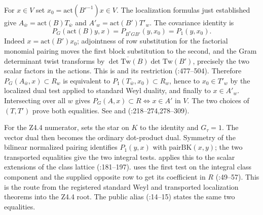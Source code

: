 For $x\in V$ set $x_0=\mathrm{act}(B'^{-1})x\in V$.
The localization formulas just established give
$A_{\bar w}=\mathrm{act}(B)T_{\bar w}$ and
$A'_w=\mathrm{act}(B')T'_w$. The covariance identity is
\[
 P_G(\mathrm{act}(B)y,x)
   =P_{B^*GB'}(y,x_0)=P_1(y,x_0).
\]
Indeed $x=\mathrm{act}(B')x_0$; adjointness of row substitution for
the factorial monomial pairing moves the first block substitution
to the second, and the Gram determinant twist transforms by
$\overline{\det\mathrm{Tw}(B)}\det\mathrm{Tw}(B')$, precisely
the two scalar factors in the actions. This is 
and its restriction 
(:477--504).
Therefore $P_G(A_{\bar w},x)\subset R_w$ is equivalent to
$P_1(T_{\bar w},x_0)\subset R_w$, hence to $x_0\in T'_w$ by
the localized dual test applied to standard Weyl duality, and
finally to $x\in A'_w$. Intersecting over all $w$ gives
$P_G(A,x)\subset R\iff x\in A'$ in $V$. The two choices of
$(T,T')$ prove both equalities. See  and
(:218--274,278--309).

For the Z4.4 numerator, 
sets the star on $K$ to the identity and $G_\tau=1$. The vector
dual then becomes the ordinary dot-product dual. Symmetry of the
bilinear normalized pairing identifies $P_1(y,x)$ with
$\mathrm{pairBK}(x,y)$; the two transported equalities give
the two integral tests.  applies
this to the scalar extensions of the class lattice
(:181--197).
 uses the first test on the integral
class component and the supplied opposite row to get its coefficient
in $R$ (:49--57).
This is the route from the registered standard Weyl and transported
localization theorems into the Z4.4 root. The public alias
(:14--15)
states the same two equalities.

